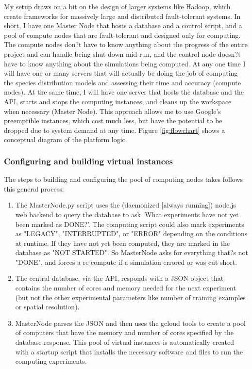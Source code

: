 \documentclass[a4paper]{article}
\begin{document}
My setup draws on a bit on the design of larger systems like Hadoop, which create frameworks for massively large and distributed fault-tolerant systems. In short, I have one Master Node that hosts a database and a control script, and a pool of compute nodes that are fault-tolerant and designed only for computing. The compute nodes don?t have to know anything about the progress of the entire project and can handle being shut down mid-run, and the control node doesn?t have to know anything about the simulations being computed.  At any one time I will have one or many servers that will actually be doing the job of computing the species distribution models and assessing their time and accuracy (compute nodes). At the same time, I will have one server that hosts the database and the API, starts and stops the computing instances, and cleans up the workspace when necessary (Master Node). This approach allows me to use Google's preemptible instances, which cost much less, but have the potential to be dropped due to system demand at any time. Figure \ref{fig:flowchart} shows a conceptual diagram of the platform logic.

\subsubsection{Configuring and building virtual instances}
The steps to building and configuring the pool of computing nodes takes follows this general process: 
\begin{enumerate}
\item The MasterNode.py script uses the (daemonized [always running]) node.js web backend to query the database to ask 'What experiments have not yet been marked as DONE?'. The computing script could also mark experiments as "LEGACY", "INTERRUPTED", or "ERROR" depending on the conditions at runtime. If they have not yet been computed, they are marked in the database as "NOT STARTED". So MasterNode asks for everything that?s not "DONE", and forces a re-compute if a simulation errored or was cut short.
\item The central database, via the API, responds with a JSON object that contains the number of cores and memory needed for the next experiment (but not the other experimental parameters like number of training examples or spatial resolution).
\item MasterNode parses the JSON and then uses the gcloud tools to create a pool of computers that have the memory and number of cores specified by the database response. This pool of virtual instances is automatically created with a startup script that installs the necessary software and files to run the computing experiments.
\end{enumerate}
\end{document}
